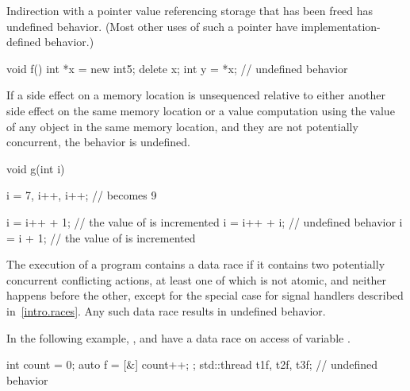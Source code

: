 
\pnum
Indirection
with a pointer value referencing storage that has been freed
has undefined behavior.
(Most other uses of such a pointer have implementation-defined behavior.)

\pnum
\begin{example}
\begin{codeblock}
void f()
{
    int *x = new int{5};
    delete x;
    int y = *x; // undefined behavior
}
\end{codeblock}
\end{example}


\pnum
If a side effect on a memory location
is unsequenced relative to either another side effect
on the same memory location
or a value computation using the value of any object
in the same memory location,
and they are not potentially concurrent,
the behavior is undefined.

\pnum
\begin{example}
\begin{codeblock}
void g(int i) {
  i = 7, i++, i++;  //  becomes 9

  i = i++ + 1;  // the value of  is incremented
  i = i++ + i;  // undefined behavior
  i = i + 1;    // the value of  is incremented
}
\end{codeblock}
\end{example}


\pnum
The execution of a program contains a data race
if it contains two potentially concurrent conflicting actions,
at least one of which is not atomic,
and neither happens before the other,
except for the special case for signal handlers
described in~\ref{intro.races}.
Any such data race results in undefined behavior.

\pnum
\begin{example}
In the following example,
,  and 
have a data race on access of variable .
\begin{codeblock}
int count = 0;
auto f = [&] { count++; };
std::thread t1{f}, t2{f}, t3{f};    // undefined behavior
\end{codeblock}
\end{example}


